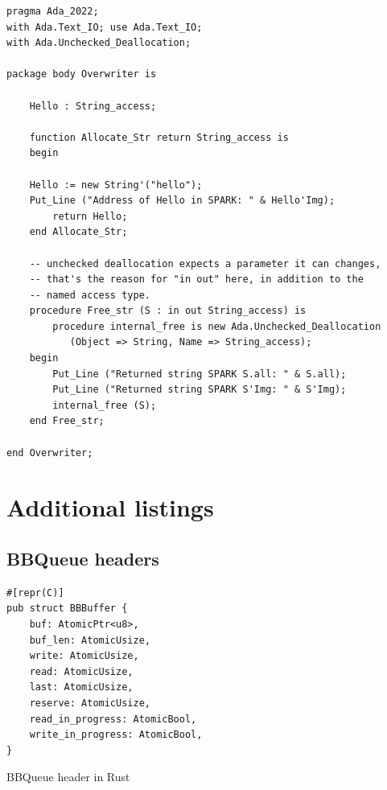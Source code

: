\documentclass[nomenclature, english, bibtex]{kththesis}
\begin{document}
{\begin{verbatim}
pragma Ada_2022;
with Ada.Text_IO; use Ada.Text_IO;
with Ada.Unchecked_Deallocation;

package body Overwriter is

    Hello : String_access;

    function Allocate_Str return String_access is
    begin

    Hello := new String'("hello");
    Put_Line ("Address of Hello in SPARK: " & Hello'Img);
        return Hello;
    end Allocate_Str;

    -- unchecked deallocation expects a parameter it can changes,
    -- that's the reason for "in out" here, in addition to the
    -- named access type.
    procedure Free_str (S : in out String_access) is
        procedure internal_free is new Ada.Unchecked_Deallocation
           (Object => String, Name => String_access);
    begin
        Put_Line ("Returned string SPARK S.all: " & S.all);
        Put_Line ("Returned string SPARK S'Img: " & S'Img);
        internal_free (S);
    end Free_str;

end Overwriter;

\end{verbatim}
\chapter{Additional listings}
\label{ch:additionallistings}

\section{BBQueue headers}
\begin{listing}[!ht]
\begin{verbatim}
#[repr(C)]
pub struct BBBuffer {
    buf: AtomicPtr<u8>,
    buf_len: AtomicUsize,
    write: AtomicUsize,
    read: AtomicUsize,
    last: AtomicUsize,
    reserve: AtomicUsize,
    read_in_progress: AtomicBool,
    write_in_progress: AtomicBool,
}
\end{verbatim}
\caption[BBQueue header in Rust]{BBQueue header in Rust}
\label{lst:rust_bbqueue_header}
\end{listing}
\FloatBarrier

}
\end{document}
